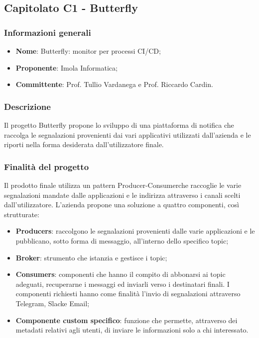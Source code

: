 \subsection{Capitolato C1 - Butterfly}
\subsubsection{Informazioni generali}
\begin{itemize}
	\item \textbf{Nome}: Butterfly: monitor per processi CI/CD;
	\item \textbf{Proponente}: Imola Informatica;
	\item \textbf{Committente}: Prof. Tullio Vardanega e Prof. Riccardo Cardin.
\end{itemize}
\subsubsection{Descrizione}
Il progetto Butterfly propone lo sviluppo di una piattaforma di notifica che raccolga le segnalazioni provenienti dai vari applicativi utilizzati dall'azienda e le riporti nella forma desiderata dall'utilizzatore finale.

\subsubsection{Finalità del progetto}
Il prodotto finale utilizza un pattern Producer-Consumer\glosp che raccoglie le varie segnalazioni mandate dalle applicazioni e le indirizza attraverso i canali scelti dall'utilizzatore. L’azienda propone una soluzione a quattro componenti, così strutturate:
\begin{itemize}
	\item \textbf{Producers}: raccolgono le segnalazioni provenienti dalle varie applicazioni e le pubblicano, sotto forma di messaggio, all'interno dello specifico topic\glo;
	\item \textbf{Broker}: strumento che istanzia e gestisce i topic;
	\item \textbf{Consumers}: componenti che hanno il compito di abbonarsi ai topic adeguati, recuperarne i messaggi ed inviarli verso i destinatari finali. I componenti richiesti hanno come finalità l’invio di segnalazioni attraverso Telegram\glo, Slack\glosp e Email;
    \item \textbf{Componente custom specifico}: funzione che permette, attraverso dei metadati relativi agli utenti, di inviare le informazioni solo a chi interessato.
\end{itemize}
